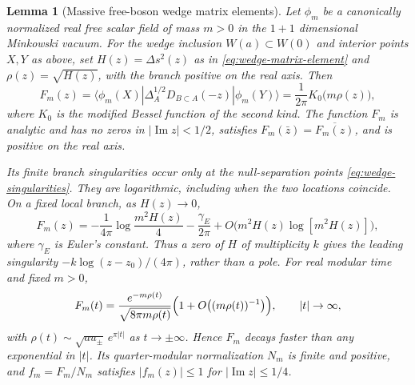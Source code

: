 \documentclass[a4paper,11pt]{article}
\newtheorem{lemma}[theorem]{Lemma}
\theoremstyle{definition}
\begin{document}
\begin{lemma}[Massive free-boson wedge matrix elements]
\label{lem:massive-free-boson}
Let $\phi_m$ be a canonically normalized real free scalar field of mass $m>0$ in the $1+1$ dimensional Minkowski vacuum. For the wedge inclusion $W(a)\subset W(0)$ and interior points $X,Y$ as above, set $H(z)=\Delta s^2(z)$ as in \eqref{eq:wedge-matrix-element} and $\rho(z)=\sqrt{H(z)}$, with the branch positive on the real axis. Then
\begin{equation}
 F_m(z)=\langle\phi_m(X)|\Delta_A^{1/2}D_{B\subset A}(-z)|\phi_m(Y)\rangle=\frac1{2\pi}K_0\bigl(m\rho(z)\bigr),
 \label{eq:massive-wedge}
\end{equation}
where $K_0$ is the modified Bessel function of the second kind. The function $F_m$ is analytic and has no zeros in $|\operatorname{Im}z|<1/2$, satisfies $F_m(\bar z)=\overline{F_m(z)}$, and is positive on the real axis.

Its finite branch singularities occur only at the null-separation points \eqref{eq:wedge-singularities}. They are logarithmic, including when the two locations coincide. On a fixed local branch, as $H(z)\to0$,
\begin{equation}
 F_m(z)=-\frac1{4\pi}\log\frac{m^2H(z)}4-\frac{\gamma_E}{2\pi}+O\bigl(m^2H(z)\log[m^2H(z)]\bigr),
 \label{eq:massive-short-distance}
\end{equation}
where $\gamma_E$ is Euler's constant. Thus a zero of $H$ of multiplicity $k$ gives the leading singularity $-k\log(z-z_0)/(4\pi)$, rather than a pole. For real modular time and fixed $m>0$,
\begin{equation}
 F_m(t)=\frac{e^{-m\rho(t)}}{\sqrt{8\pi m\rho(t)}}\Bigl(1+O\bigl((m\rho(t))^{-1}\bigr)\Bigr),\qquad|t|\to\infty,
 \label{eq:massive-long-distance}
\end{equation}
with $\rho(t)\sim\sqrt{au_\pm}\,e^{\pi|t|}$ as $t\to\pm\infty$. Hence $F_m$ decays faster than any exponential in $|t|$. Its quarter-modular normalization $N_m$ is finite and positive, and $f_m=F_m/N_m$ satisfies $|f_m(z)|\le1$ for $|\operatorname{Im}z|\le1/4$.
\end{lemma}
\end{document}
